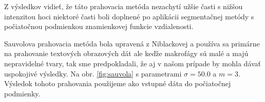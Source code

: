 \documentclass[a4paper,11pt,oneside]{article}%
\begin{document}
Z výsledkov vidieť, že táto prahovacia metóda nezachytí užšie časti s nižšou intenzitou hoci niektoré časti boli doplnené po aplikácii segmentačnej metódy s počiatočnou podmienkou znamienkovej funkcie vzdialenosti. 

Sauvolova prahovacia metóda bola upravená z Niblackovej a používa sa primárne na prahovanie textových obrazových dát ale keďže makrofágy sú malé a majú nepravidelné tvary, tak sme predpokladali, že aj v našom prípade by mohla dávať uspokojivé výsledky. Na obr. \ref{fig:sauvola} s parametrami $\sigma = 50.0$ a $m = 3$. Výsledok tohoto prahovania použijeme ako vstupné dáta do počiatočnej podmienky.

\begin{figure}[H]  
    \hspace{5px}
    \subfloat[] 

\end{figure}
\end{document}
